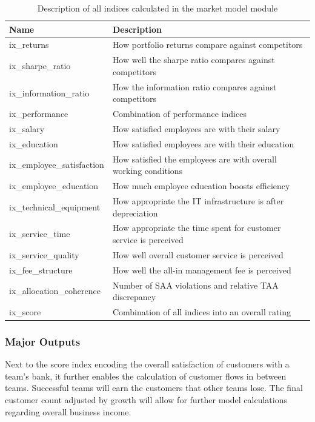 \begin{table}[h!]
  \begin{tabular}{lp{11cm}}
    \toprule
    Name & Description \\
    \midrule
    ix\_returns & How portfolio returns compare against competitors \\
    \midrule
    ix\_sharpe\_ratio & How well the sharpe ratio compares against competitors \\
    ix\_information\_ratio & How the information ratio compares against competitors \\
    ix\_performance & Combination of performance indices \\
    \midrule
    ix\_salary & How satisfied employees are with their salary \\
    ix\_education & How satisfied employees are with their education \\
    ix\_employee\_satisfaction & How satisfied the employees are with overall working conditions \\
    \midrule
    ix\_employee\_education & How much employee education boosts efficiency \\
    ix\_technical\_equipment & How appropriate the IT infrastructure is after depreciation  \\
      ix\_service\_time & How appropriate the time spent for customer service is perceived \\
    ix\_service\_quality & How well overall customer service is perceived \\
    \midrule
    ix\_fee\_structure & How well the all-in management fee is perceived \\
    \midrule
    ix\_allocation\_coherence & Number of SAA violations and relative TAA discrepancy \\
    \midrule
    ix\_score & Combination of all indices into an overall rating \\
    \bottomrule
  \end{tabular}
  \centering
  \caption{Description of all indices calculated in the market model module}
  \label{table:market_model_indices}
\end{table}


\subsubsection{Major Outputs}
Next to the score index encoding the overall satisfaction of customers with a team's bank, it further enables the calculation of customer flows in between teams. Successful teams will earn the customers that other teams lose. The final customer count adjusted by growth will allow for further model calculations regarding overall business income.


